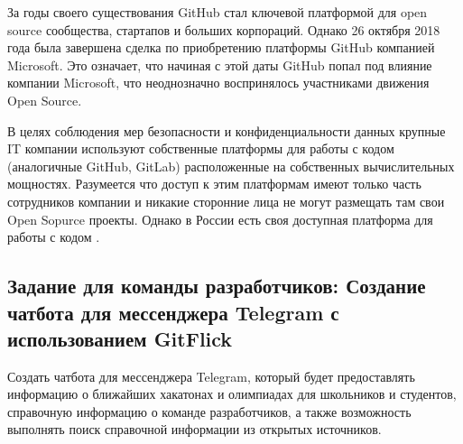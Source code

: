 \documentclass[letterpaper,10pt,russian]{sphinxmanual}
\begin{document}
\sphinxAtStartPar
За годы своего существования GitHub стал ключевой платформой для open source сообщества, стартапов и больших корпораций. Однако 26 октября 2018 года была завершена сделка по приобретению платформы GitHub компанией Microsoft. Это означает, что начиная с этой даты GitHub попал под влияние компании Microsoft, что неоднозначно воспринялось участниками движения Open Source.

\sphinxAtStartPar
В целях соблюдения мер безопасности и конфиденциальности данных крупные IT компании используют собственные платформы для работы с кодом (аналогичные GitHub, GitLab) расположенные на собственных вычислительных мощностях. Разумеется что доступ к этим платформам имеют только часть сотрудников компании и никакие сторонние лица не могут размещать там свои Open Sopurce проекты. Однако в России есть своя доступная платформа для работы с кодом \sphinxhyphen{} .


\subsection{Задание для команды разработчиков: Создание чат\sphinxhyphen{}бота для мессенджера Telegram с использованием GitFlick}
\label{\detokenize{educational_materials/team_work_on_a_gitflic/content:telegram-gitflick}}
\sphinxAtStartPar
{} Создать чат\sphinxhyphen{}бота для мессенджера Telegram, который будет предоставлять информацию о ближайших хакатонах и олимпиадах для школьников и студентов, справочную информацию о команде разработчиков, а также возможность выполнять поиск справочной информации из открытых источников.
\end{document}
